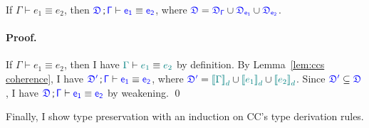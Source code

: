 \begin{lemma}[Coherence] If $\Gamma \vdash e_1 \equiv e_2$, then $\targetcon \vdash \target{e_1} \equiv \target{e_2}$, where
$\target{\fdef} = \target{\fdef_{\Gamma}} \cup \target{\fdef_{e_1}} \cup \target{\fdef_{e_2}}$.
\paragraph{Proof.} If $\Gamma \vdash e_1 \equiv e_2$, then I have $\color{teal}{\Gamma}\color{black} \vdash \color{teal}{e_1}\color{black} \equiv \color{teal}{e_2}\color{black}$
by definition. By Lemma~\ref{lem:ccs coherence}, I have $\target{\fdef'} \semicolon \target{\Gamma} \vdash \target{e_1} \equiv \target{e_2}$, where
$\target{\fdef'} = \helper{\bbracket{\Gamma}_d} \cup \helper{\bbracket{e_1}_d} \cup \helper{\bbracket{e_2}_d}$.
Since $\target{\fdef'} \subseteq \target{\fdef}$, I have $\targetcon \vdash \target{e_1} \equiv \target{e_2}$ by weakening. \qed

\label{lem:coherence}
\end{lemma}

Finally, I show type preservation with an induction on CC's type derivation rules. 


